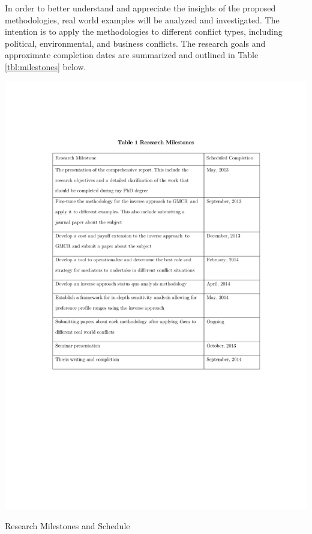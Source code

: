 \documentclass[letterpaper,12pt,titlepage,oneside,final]{book}
\begin{document}
In order to better understand and appreciate the insights of the proposed methodologies, real world examples will be analyzed and investigated. The intention is to apply the methodologies to different conflict types, including political, environmental, and business conflicts.
The research goals and approximate completion dates are summarized and outlined in Table \ref{tbl:milestones} below.
\begin{table}[H]
\centering
\includegraphics[scale=.8]{PDF-IMG/Research_Milestones.pdf}

\caption{Research Milestones and Schedule}

\label{tbl:milestones}
\end{table}
\end{document}
